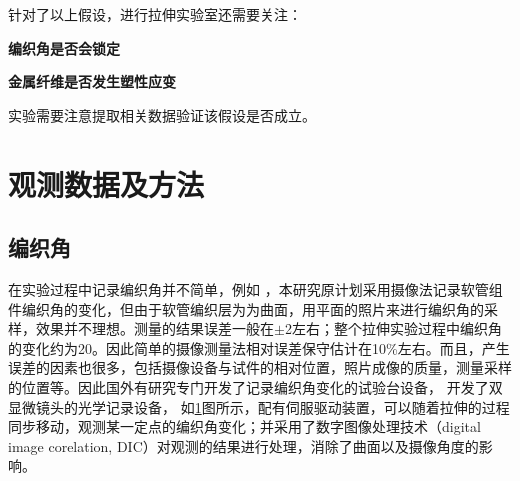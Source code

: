针对了以上假设，进行拉伸实验室还需要关注：
\begin{compactitem}
	\item \textbf{编织角是否会锁定}
	\item \textbf{金属纤维是否发生塑性应变}
\end{compactitem}

实验需要注意提取相关数据验证该假设是否成立。

\section{观测数据及方法}


\subsection{编织角}
在实验过程中记录编织角并不简单，例如 ，本研究原计划采用摄像法记录软管组件编织角的变化，但由于软管编织层为为曲面，用平面的照片来进行编织角的采样，效果并不理想。测量的结果误差一般在$ \pm $2\textdegree 左右；整个拉伸实验过程中编织角的变化约为20\textdegree 。因此简单的摄像测量法相对误差保守估计在10\%左右。而且，产生误差的因素也很多，包括摄像设备与试件的相对位置，照片成像的质量，测量采样的位置等。因此国外有研究专门开发了记录编织角变化的试验台设备， \citeauthor{Leung2013}\cite{Leung2013}开发了双显微镜头的光学记录设备，
如\ref{fig:dic}图所示，配有伺服驱动装置，可以随着拉伸的过程同步移动，观测某一定点的编织角变化；并采用了数字图像处理技术（digital image corelation, DIC）对观测的结果进行处理，消除了曲面以及摄像角度的影响。

\begin{figure}[!htb]
	\centering
	\hspace{1cm}
	\label{fig:dic}
\end{figure}
